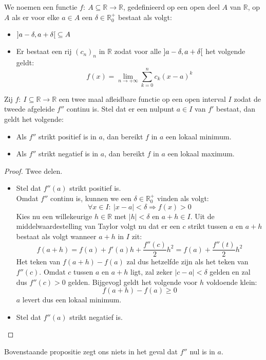 \documentclass[main.tex]{subfiles}
\begin{document}
\begin{de}
  We noemen een functie $f:\ A \subseteq \mathbb{R} \rightarrow \mathbb{R}$, gedefinieerd op een open deel $A$ van $\mathbb{R}$,  op $A$ als er voor elke $a\in A$ een $\delta \in \mathbb{R}_{0}^{+}$ bestaat als volgt:
  \begin{itemize}
  \item $\interval[open]{a-\delta}{a+\delta} \subseteq A$
  \item Er bestaat een rij $(c_{n})_{n}$ in $\mathbb{R}$ zodat voor alle $\interval[open]{a-\delta}{a+\delta}$ het volgende geldt:
    \[ f(x) = \lim_{n\rightarrow +\infty}\sum_{k=0}^{n}c_{k}(x-a)^{k} \]  
  \end{itemize}
\end{de}

\begin{bpr}
  Zij $f:\ I \subseteq \mathbb{R} \rightarrow \mathbb{R}$ een twee maal afleidbare functie op een open interval $I$ zodat de tweede afgeleide $f''$ continu is.
  Stel dat er een nulpunt $a\in I$ van $f'$ bestaat, dan geldt het volgende:
  \begin{itemize}
  \item Als $f''$ strikt positief is in $a$, dan bereikt $f$ in $a$ een lokaal minimum.
  \item Als $f''$ strikt negatief is in $a$, dan bereikt $f$ in $a$ een lokaal maximum.
  \end{itemize}

  \begin{proof}
    Twee delen.
    \begin{itemize}
    \item Stel dat $f''(a)$ strikt positief is.\\
      Omdat $f''$ continu is, kunnen we een $\delta \in \mathbb{R}_{0}^{+}$ vinden als volgt:\waarom
      \[ \forall x\in I:\ |x-a|<\delta \Rightarrow  f(x)>0 \]
      Kies nu een willekeurige $h\in \mathbb{R}$ met $|h| < \delta$ en $a+h\in I$.
      Uit de middelwaardestelling van Taylor volgt nu dat er een $c$ strikt tussen $a$ en $a+h$ bestaat als volgt  wanneer $a+h$ in $I$ zit:
      \[ f(a+h) = f(a) + f'(a)h + \frac{f''(c)}{2}h^{2} = f(a) + \frac{f''(t)}{2}h^{2} \]
      Het teken van $f(a+h)-f(a)$ zal dus hetzelfde zijn als het teken van $f''(c)$.
      Omdat $c$ tussen $a$ en $a+h$ ligt, zal zeker $|c-a|<\delta$ gelden en zal dus $f''(c)>0$ gelden.
      Bijgevogl geldt het volgende voor $h$ voldoende klein:
      \[ f(a+h)-f(a) \ge 0 \]
      $a$ levert dus een lokaal minimum.
    \item Stel dat $f''(a)$ strikt negatief is.\\
    \end{itemize}
  \end{proof}
\end{bpr}

\begin{opm}
  Bovenstaande propositie zegt ons niets in het geval dat $f''$ nul is in $a$.
\end{opm}
\end{document}
